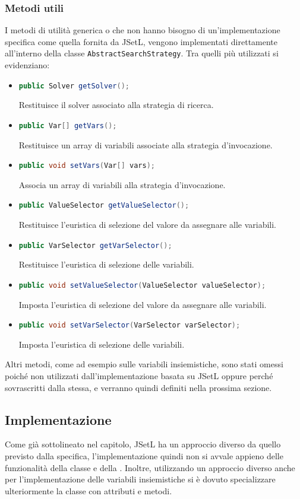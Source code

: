 \subsubsection{Metodi utili}
I metodi di utilità generica o che non hanno bisogno di un'implementazione
specifica come quella fornita da JSetL, vengono implementati 
direttamente all'interno della classe \texttt{AbstractSearchStrategy}.
Tra quelli più utilizzati si evidenziano:
\begin{itemize}
\item \lstinline[language=Java]$public Solver getSolver();$

Restituisce il solver associato alla strategia di ricerca.
\item \lstinline[language=Java]$public Var[] getVars();$

Restituisce un array di variabili associate alla strategia d'invocazione.
\item \lstinline[language=Java]$public void setVars(Var[] vars);$

Associa un array di variabili alla strategia d'invocazione.
\item \lstinline[language=Java]$public ValueSelector getValueSelector();$

Restituisce l'euristica di selezione del valore da assegnare alle variabili.
\item \lstinline[language=Java]$public VarSelector getVarSelector();$

Restituisce l'euristica di selezione delle variabili.
\item \lstinline[language=Java]$public void setValueSelector(ValueSelector valueSelector);$

Imposta l'euristica di selezione del valore da assegnare alle variabili.
\item \lstinline[language=Java]$public void setVarSelector(VarSelector varSelector);$

Imposta l'euristica di selezione delle variabili.
\end{itemize}

Altri metodi, come ad esempio  sulle variabili insiemistiche,
sono stati omessi poiché non utilizzati dall'implementazione basata su JSetL
oppure perché sovrascritti dalla stessa, e verranno quindi definiti nella
prossima sezione.

\subsection{Implementazione}
Come già sottolineato nel capitolo, JSetL ha un approccio diverso da quello
previsto dalla specifica, l'implementazione quindi non si avvale appieno
delle funzionalità della classe  e della
. Inoltre, utilizzando un approccio diverso anche per
l'implementazione delle variabili insiemistiche si è dovuto specializzare
ulteriormente la classe con attributi e metodi.

